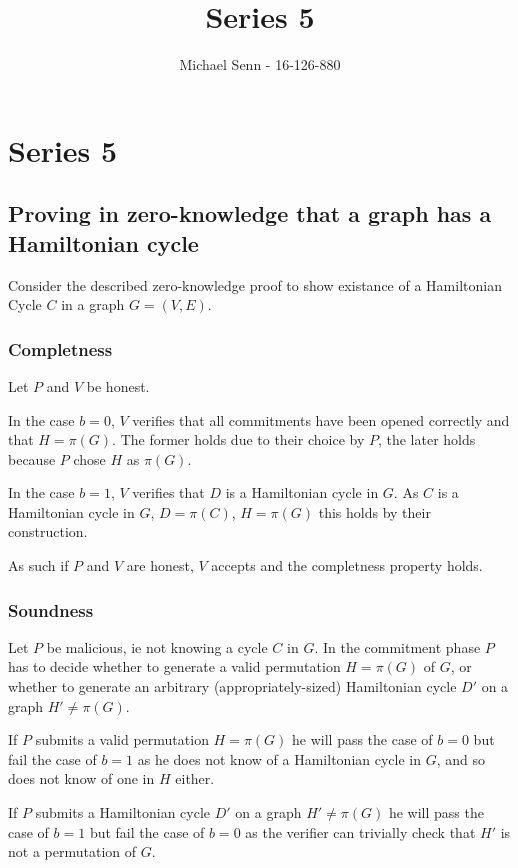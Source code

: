 \documentclass[a4paper]{scrreprt}
\title{Series 5}
\author{Michael Senn \maillink{michael.senn@students.unibe.ch} - 16-126-880}
\date{\printdate}
\begin{document}
\maketitle


\setcounter{chapter}{4}

\chapter{Series 5}

\section{Proving in zero-knowledge that a graph has a Hamiltonian cycle}

Consider the described zero-knowledge proof to show existance of a Hamiltonian
Cycle $C$ in a graph $G = (V, E)$.

\subsection{Completness}

Let $P$ and $V$ be honest.

In the case $b = 0$, $V$ verifies that all commitments have been opened
correctly and that $H = \pi(G)$. The former holds due to their choice by $P$,
the later holds because $P$ chose $H$ as $\pi(G)$.

In the case $b = 1$, $V$ verifies that $D$ is a Hamiltonian cycle in $G$. As
$C$ is a Hamiltonian cycle in $G$, $D = \pi(C)$, $H = \pi(G)$ this holds by
their construction.

As such if $P$ and $V$ are honest, $V$ accepts and the completness property
holds.

\subsection{Soundness}

Let $P$ be malicious, ie not knowing a cycle $C$ in $G$. In the commitment
phase $P$ has to decide whether to generate a valid permutation $H = \pi(G)$ of
$G$, or whether to generate an arbitrary (appropriately-sized) Hamiltonian
cycle $D'$ on a graph $H' \neq \pi(G)$.

If $P$ submits a valid permutation $H = \pi(G)$ he will pass the case of $b =
0$ but fail the case of $b = 1$ as he does not know of a Hamiltonian cycle in
$G$, and so does not know of one in $H$ either.

If $P$ submits a Hamiltonian cycle $D'$ on a graph $H' \neq \pi(G)$ he will
pass the case of $b = 1$ but fail the case of $b = 0$ as the verifier can
trivially check that $H'$ is not a permutation of $G$.
\end{document}

